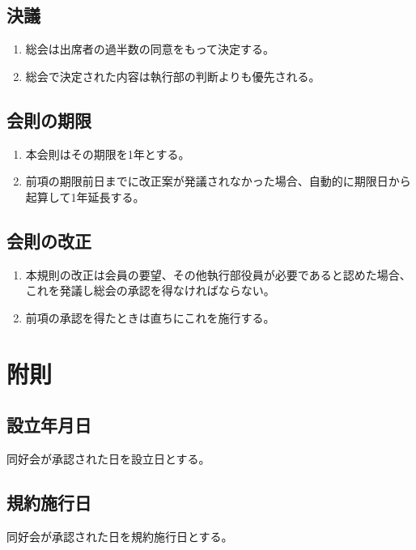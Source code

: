 \documentclass{jsreport}
\begin{document}
\section{決議}
\begin{enumerate}
    \item 総会は出席者の過半数の同意をもって決定する。
    \item 総会で決定された内容は執行部の判断よりも優先される。
\end{enumerate}

\section{会則の期限}
\begin{enumerate}
    \item 本会則はその期限を1年とする。
    \item 前項の期限前日までに改正案が発議されなかった場合、自動的に期限日から起算して1年延長する。
\end{enumerate}

\section{会則の改正}
\begin{enumerate}
    \item 本規則の改正は会員の要望、その他執行部役員が必要であると認めた場合、これを発議し総会の承認を得なければならない。
    \item 前項の承認を得たときは直ちにこれを施行する。
\end{enumerate}

\chapter{附則}
\section{設立年月日}
同好会が承認された日を設立日とする。

\section{規約施行日}
同好会が承認された日を規約施行日とする。
\end{document}
